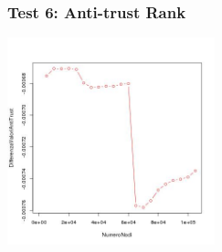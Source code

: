 \documentclass{beamer}
\begin{document}
\begin{frame}
\frametitle{Test 6: Anti-trust Rank}
\begin{center}
 \includegraphics[height=6cm]{immagini/test6/averageCompleteTest_antitrust_62}
\end{center}
\end{frame}
\end{document}
